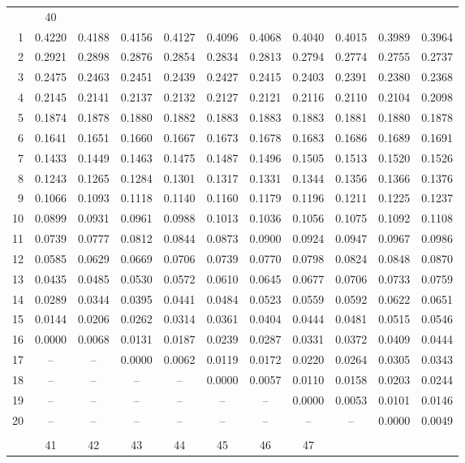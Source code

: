 \documentclass[draft]{article}
\begin{document}
\begin{table}
\begin{center}
\begin{tabular}{rcccccccccc}
  & \multicolumn{1}{c}{40} \\ \cline{2-11}
 1&0.4220&0.4188&0.4156&0.4127&0.4096&0.4068&0.4040&0.4015&0.3989&0.3964\\
 2&0.2921&0.2898&0.2876&0.2854&0.2834&0.2813&0.2794&0.2774&0.2755&0.2737\\
 3&0.2475&0.2463&0.2451&0.2439&0.2427&0.2415&0.2403&0.2391&0.2380&0.2368\\
 4&0.2145&0.2141&0.2137&0.2132&0.2127&0.2121&0.2116&0.2110&0.2104&0.2098\\
 5&0.1874&0.1878&0.1880&0.1882&0.1883&0.1883&0.1883&0.1881&0.1880&0.1878\\
 6&0.1641&0.1651&0.1660&0.1667&0.1673&0.1678&0.1683&0.1686&0.1689&0.1691\\
 7&0.1433&0.1449&0.1463&0.1475&0.1487&0.1496&0.1505&0.1513&0.1520&0.1526\\
 8&0.1243&0.1265&0.1284&0.1301&0.1317&0.1331&0.1344&0.1356&0.1366&0.1376\\
 9&0.1066&0.1093&0.1118&0.1140&0.1160&0.1179&0.1196&0.1211&0.1225&0.1237\\
10&0.0899&0.0931&0.0961&0.0988&0.1013&0.1036&0.1056&0.1075&0.1092&0.1108\\
11&0.0739&0.0777&0.0812&0.0844&0.0873&0.0900&0.0924&0.0947&0.0967&0.0986\\
12&0.0585&0.0629&0.0669&0.0706&0.0739&0.0770&0.0798&0.0824&0.0848&0.0870\\
13&0.0435&0.0485&0.0530&0.0572&0.0610&0.0645&0.0677&0.0706&0.0733&0.0759\\
14&0.0289&0.0344&0.0395&0.0441&0.0484&0.0523&0.0559&0.0592&0.0622&0.0651\\
15&0.0144&0.0206&0.0262&0.0314&0.0361&0.0404&0.0444&0.0481&0.0515&0.0546\\
16&0.0000&0.0068&0.0131&0.0187&0.0239&0.0287&0.0331&0.0372&0.0409&0.0444\\
17&  --  &  --  &0.0000&0.0062&0.0119&0.0172&0.0220&0.0264&0.0305&0.0343\\
18&  --  &  --  &  --  &  --  &0.0000&0.0057&0.0110&0.0158&0.0203&0.0244\\
19&  --  &  --  &  --  &  --  &  --  &  --  &0.0000&0.0053&0.0101&0.0146\\
20&  --  &  --  &  --  &  --  &  --  &  --  &  --  &  --  &0.0000&0.0049\\
\\
  & \multicolumn{1}{c}{41}
  & \multicolumn{1}{c}{42}
  & \multicolumn{1}{c}{43}
  & \multicolumn{1}{c}{44}
  & \multicolumn{1}{c}{45}
  & \multicolumn{1}{c}{46}
  & \multicolumn{1}{c}{47}

\end{tabular}
\end{center}
\end{table}
\end{document}

